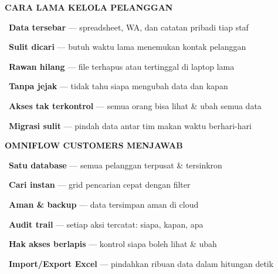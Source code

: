 \documentclass[a4paper]{article}
\begin{document}
\noindent
\begin{minipage}[t]{0.485\textwidth}
    \colorbox{RedLight}{%
        \begin{minipage}{\dimexpr\textwidth-2\fboxsep\relax}
            {\fontsize{10}{13}\selectfont\bfseries\color{RedText} CARA LAMA KELOLA PELANGGAN}
        \end{minipage}}\par
    \vspace{4pt}

    {\fontsize{9.5}{13}\selectfont\color{TextDark}%
    \textbullet\ \textbf{Data tersebar} --- spreadsheet, WA, dan catatan pribadi tiap staf\par\vspace{4pt}%
    \textbullet\ \textbf{Sulit dicari} --- butuh waktu lama menemukan kontak pelanggan\par\vspace{4pt}%
    \textbullet\ \textbf{Rawan hilang} --- file terhapus atau tertinggal di laptop lama\par\vspace{4pt}%
    \textbullet\ \textbf{Tanpa jejak} --- tidak tahu siapa mengubah data dan kapan\par\vspace{4pt}%
    \textbullet\ \textbf{Akses tak terkontrol} --- semua orang bisa lihat \& ubah semua data\par\vspace{4pt}%
    \textbullet\ \textbf{Migrasi sulit} --- pindah data antar tim makan waktu berhari-hari}%
\end{minipage}%
\hfill%
\begin{minipage}[t]{0.485\textwidth}
    \colorbox{BluePrimary}{%
        \begin{minipage}{\dimexpr\textwidth-2\fboxsep\relax}
            {\fontsize{10}{13}\selectfont\bfseries\color{White} OMNIFLOW CUSTOMERS MENJAWAB}
        \end{minipage}}\par
    \vspace{4pt}

    {\fontsize{9.5}{13}\selectfont\color{TextDark}%
    \textbullet\ \textbf{Satu database} --- semua pelanggan terpusat \& tersinkron\par\vspace{4pt}%
    \textbullet\ \textbf{Cari instan} --- grid pencarian cepat dengan filter\par\vspace{4pt}%
    \textbullet\ \textbf{Aman \& backup} --- data tersimpan aman di cloud\par\vspace{4pt}%
    \textbullet\ \textbf{Audit trail} --- setiap aksi tercatat: siapa, kapan, apa\par\vspace{4pt}%
    \textbullet\ \textbf{Hak akses berlapis} --- kontrol siapa boleh lihat \& ubah\par\vspace{4pt}%
    \textbullet\ \textbf{Import/Export Excel} --- pindahkan ribuan data dalam hitungan detik}%
\end{minipage}
\end{document}

